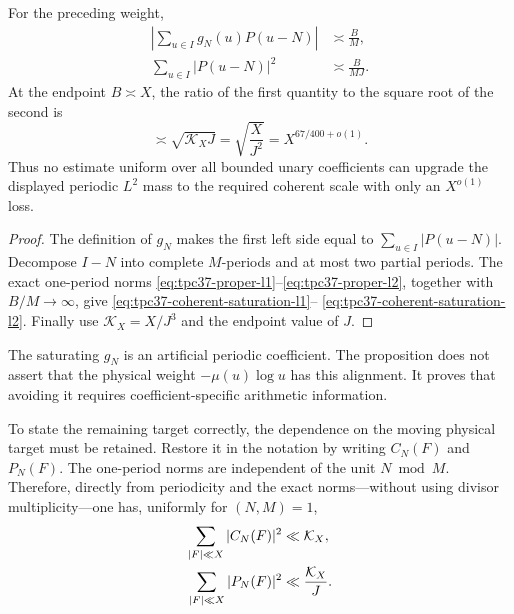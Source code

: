 \begin{proposition}
\label{prop:tpc37-coherent-face-no-go}
For the preceding weight,
\begin{align}
 \left|\sum_{u\in I}g_N(u)P(u-N)\right|
 &\asymp\frac BM,
 \label{eq:tpc37-coherent-saturation-l1}\\
 \sum_{u\in I}|P(u-N)|^2
 &\asymp\frac B{MJ}.
 \label{eq:tpc37-coherent-saturation-l2}
\end{align}
At the endpoint \(B\asymp X\), the ratio of the first quantity to the
square root of the second is
\begin{equation}
 \boxed{
 \asymp\sqrt{\mathcal K_X J}
 =\sqrt{\frac X{J^2}}
 =X^{67/400+o(1)}.}
 \label{eq:tpc37-coherent-upgrade-loss}
\end{equation}
Thus no estimate uniform over all bounded unary coefficients can upgrade
the displayed periodic \(L^2\) mass to the required coherent scale with
only an \(X^{o(1)}\) loss.
\end{proposition}

\begin{proof}
The definition of \(g_N\) makes the first left side equal to
\(\sum_{u\in I}|P(u-N)|\).  Decompose \(I-N\) into complete \(M\)-periods
and at most two partial periods.  The exact one-period norms
\eqref{eq:tpc37-proper-l1}--\eqref{eq:tpc37-proper-l2}, together with
\(B/M\to\infty\), give
\eqref{eq:tpc37-coherent-saturation-l1}--
\eqref{eq:tpc37-coherent-saturation-l2}.  Finally use
\(\mathcal K_X=X/J^3\) and the endpoint value of \(J\).
\end{proof}

The saturating \(g_N\) is an artificial periodic coefficient.  The
proposition does not assert that the physical weight
\(-\mu(u)\log u\) has this alignment.  It proves that avoiding it requires
coefficient-specific arithmetic information.

To state the remaining target correctly, the dependence on the moving
physical target must be retained.  Restore it in the notation by writing
\(C_N(F)\) and \(P_N(F)\).  The one-period norms are independent of the
unit \(N\bmod M\).  Therefore, directly from periodicity and the exact
norms---without using divisor multiplicity---one has, uniformly for
\((N,M)=1\),
\begin{align}
 \sum_{|F|\ll X}|C_N(F)|^2
 &\ll\mathcal K_X,
 \notag\\
 \sum_{|F|\ll X}|P_N(F)|^2
 &\ll\frac{\mathcal K_X}{J}.
 \label{eq:tpc37-direct-face-period-ledger}
\end{align}

